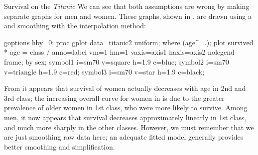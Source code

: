 \begin{Example}[titanic4]{Survival on the \emph{Titanic}}
We can see that both assumptions are wrong by making separate graphs
for men and women.
These graphs, shown in , are drawn
using a  and smoothing with the 
interpolation method:
\begin{listing}
goptions hby=0;
proc gplot data=titanic2 uniform;
   where (age^=.);
   plot survived * age = class /
      anno=label vm=1 hm=1 vaxis=axis1 haxis=axis2 nolegend frame;
   by sex;
    symbol1 i=sm70 v=square   h=1.9 c=blue;
    symbol2 i=sm70 v=triangle h=1.9 c=red;
    symbol3 i=sm70 v=star     h=1.9 c=black;
\end{listing}
From  it appears that survival of women actually
decreases with age in 2nd and 3rd class; the increasing overall curve
for women in  is due to the greater prevalence of
older women in 1st class, who were more likely to survive.
Among men, it now appears that survival decreases approximately linearly
in 1st class, and much more sharply in the other classes.
However, we must remember that we are just smoothing raw data here; an adequate fitted
model generally provides better smoothing
and simplification.

\end{Example}
